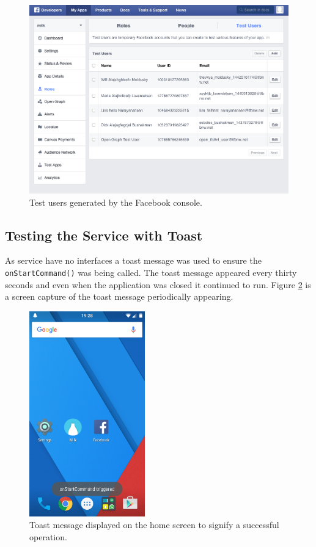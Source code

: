 \documentclass[a4paper, 11pt]{article}
\begin{document}
\begin{figure}[!htbp]
\centering
\includegraphics[width=\textwidth]{facebookTest}
\caption{Test users generated by the Facebook console.}\label{fig:facebookTest}
\end{figure}
\clearpage

\subsection{Testing the Service with Toast}As service have no interfaces a toast message was used to ensure the \texttt{onStartCommand()} was being called. The toast message appeared every thirty seconds and even when the application was closed it continued to run. Figure \ref{fig:toast2} is a screen capture of the toast message periodically appearing. 
\vspace{\baselineskip}

\begin{figure}[!htbp]
\centering
\includegraphics[width=5cm]{toast2}
\caption{Toast message displayed on the home screen to signify a successful operation.}\label{fig:toast2}
\end{figure}
\clearpage
\end{document}
